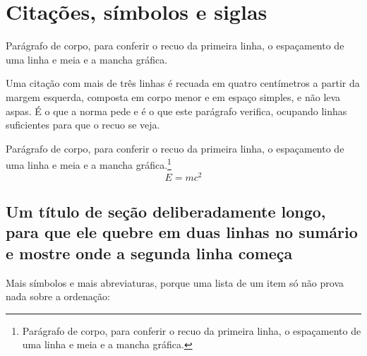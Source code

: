 \documentclass[dsc,pdfa,coorientador,numbers,twoside,orientadorexamina]{coppe}
\begin{document}
  \chapter{Citações, símbolos e siglas}
  Parágrafo de corpo, para conferir o recuo da primeira linha, o espaçamento de uma linha e meia e a mancha gráfica. \citep{book-example}
  \begin{longquote}
  Uma citação com mais de três linhas é recuada em quatro centímetros a partir da margem esquerda, composta em corpo menor e em espaço simples, e não leva aspas. É o que a norma pede e é o que este parágrafo verifica, ocupando linhas suficientes para que o recuo se veja.
  \end{longquote}
  Parágrafo de corpo, para conferir o recuo da primeira linha, o espaçamento de uma linha e meia e a mancha gráfica.\footnote{Parágrafo de corpo, para conferir o recuo da primeira linha, o espaçamento de uma linha e meia e a mancha gráfica.}
  \begin{equation}
    E = mc^{2} \label{eq:adv}
  \end{equation}
    

  \section{Um título de seção deliberadamente longo, para que ele quebre
    em duas linhas no sumário e mostre onde a segunda linha começa}
  Mais símbolos e mais abreviaturas, porque uma lista de um item só não
  prova nada sobre a ordenação:
     
\end{document}
